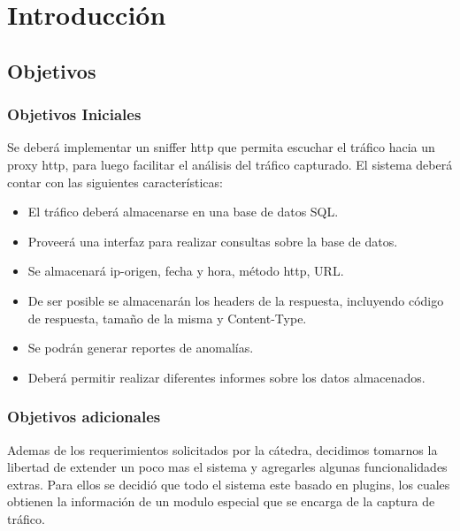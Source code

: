 \section{Introducción}

\subsection{Objetivos}

\subsubsection{Objetivos Iniciales}

 Se deberá implementar un sniffer http que permita escuchar el tráfico hacia un proxy http, para luego facilitar el análisis del tráfico capturado. El sistema deberá contar con las siguientes características:
\\
\begin{itemize}
	\item El tráfico deberá almacenarse en una base de datos SQL.
	\item Proveerá una interfaz para realizar consultas sobre la base de datos.
	\item Se almacenará ip-origen, fecha y hora, método http, URL.
	\item De ser posible se almacenarán los headers de la respuesta, incluyendo código de respuesta, tamaño de la misma y Content-Type.
	\item Se podrán generar reportes de anomalías.
	\item Deberá permitir realizar diferentes informes sobre los datos almacenados.
\end{itemize}

\subsubsection{Objetivos adicionales}
Ademas de los requerimientos solicitados por la cátedra, decidimos tomarnos la libertad de extender un poco mas el sistema y agregarles algunas funcionalidades extras. Para ellos se decidió que todo el sistema este basado en plugins, los cuales obtienen la información de un modulo especial que se encarga de la captura de tráfico.

